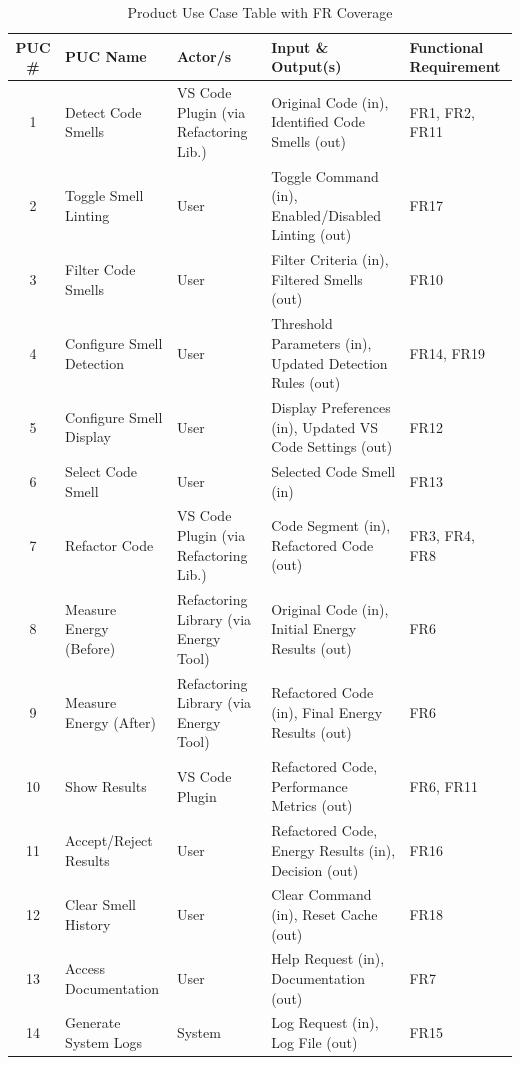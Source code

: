 \documentclass[12pt]{article}
\begin{document}
\begin{table}[H]
  \centering
  \renewcommand{\arraystretch}{0.85}
  \begin{tabularx}{\textwidth}{|c|
      >{\raggedright\arraybackslash}X|
      >{\raggedright\arraybackslash}p{1in}|
      >{\raggedright\arraybackslash}X|
      >{\raggedright\arraybackslash}p{0.8in}|}
    \toprule 
    \textbf{PUC \#} & \textbf{PUC Name} & \textbf{Actor/s} & \textbf{Input \& Output(s)} & \textbf{Functional Requirement} \\
    \midrule
    1 & Detect Code Smells & VS Code Plugin (via Refactoring Lib.) & Original Code (in), Identified Code Smells (out) & FR1, FR2, FR11 \\
    2 & Toggle Smell Linting & User & Toggle Command (in), Enabled/Disabled Linting (out) & FR17 \\
    3 & Filter Code Smells & User & Filter Criteria (in), Filtered Smells (out) & FR10 \\
    4 & Configure Smell Detection & User & Threshold Parameters (in), Updated Detection Rules (out) & FR14, FR19 \\
    5 & Configure Smell Display & User & Display Preferences (in), Updated VS Code Settings (out) & FR12 \\
    6 & Select Code Smell & User & Selected Code Smell (in) & FR13 \\
    7 & Refactor Code & VS Code Plugin (via Refactoring Lib.) & Code Segment (in), Refactored Code (out) & FR3, FR4, FR8 \\
    8 & Measure Energy (Before) & Refactoring Library (via Energy Tool) & Original Code (in), Initial Energy Results (out) & FR6 \\
    9 & Measure Energy (After) & Refactoring Library (via Energy Tool) & Refactored Code (in), Final Energy Results (out) & FR6 \\
    10 & Show Results & VS Code Plugin & Refactored Code, Performance Metrics (out) & FR6, FR11 \\
    11 & Accept/Reject Results & User & Refactored Code, Energy Results (in), Decision (out) & FR16 \\
    12 & Clear Smell History & User & Clear Command (in), Reset Cache (out) & FR18 \\
    13 & Access Documentation & User & Help Request (in), Documentation (out) & FR7 \\
    14 & Generate System Logs & System & Log Request (in), Log File (out) & FR15 \\
    \bottomrule
  \end{tabularx}
  \caption{Product Use Case Table with FR Coverage}
  \label{tab:puc-fr}
  \vspace{-2mm}
\end{table}
\end{document}

